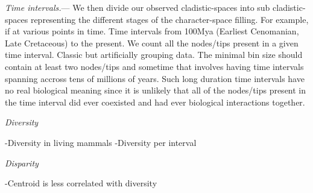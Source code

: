 \documentclass[12pt,letterpaper]{article}
\renewcommand{\subsection}[1]{%
\bigskip
\begin{center}
\begin{large}
\normalfont\itshape #1
\end{large}
\end{center}}
\renewcommand{\subsubsection}[1]{%
\vspace{2ex}
\noindent
\textit{#1.}---}
\begin{document}
\subsubsection{Time intervals}
We then divide our observed cladistic-spaces into sub cladistic-spaces representing the different stages of the character-space filling. For example, if at various points in time.
Time intervals from 100Mya (Earliest Cenomanian, Late Cretaceous) to the present.
We count all the nodes/tips present in a given time interval.
Classic but artificially grouping data. The minimal bin size should contain at least two nodes/tips and sometime that involves having time intervals spanning accross tens of millions of years. Such long duration time intervals have no real biological meaning since it is unlikely that all of the nodes/tips present in the time interval did ever coexisted and had ever biological interactions together.

\subsection{Diversity}
-Diversity in living mammals
-Diversity per interval

\subsection{Disparity}
-Centroid is less correlated with diversity
\end{document}
